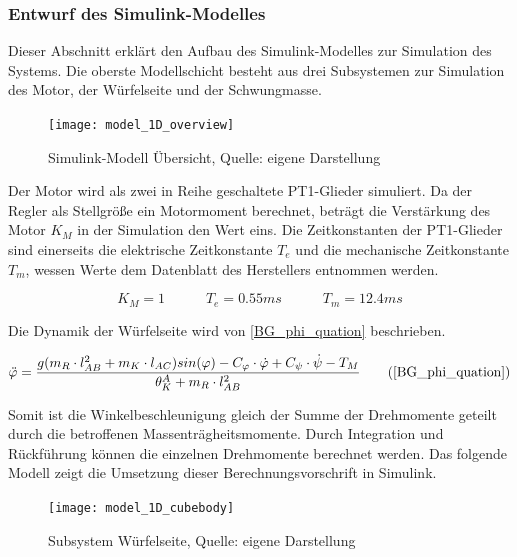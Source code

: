 \newpage
\subsubsection{Entwurf des Simulink-Modelles}
Dieser Abschnitt erklärt den Aufbau des Simulink-Modelles zur Simulation des Systems. Die oberste Modellschicht besteht aus drei Subsystemen zur Simulation des Motor, der Würfelseite und der Schwungmasse.

\begin{figure}[h]
\label{Simulink_1DModell_Overview}
\texttt{[image: model\_1D\_overview]}
\caption{Simulink-Modell Übersicht, Quelle: eigene Darstellung}
\end{figure}

Der Motor wird als zwei in Reihe geschaltete PT1-Glieder simuliert. Da der Regler als Stellgröße ein Motormoment berechnet, beträgt die Verstärkung des Motor $K_M$ in der Simulation den Wert eins. Die Zeitkonstanten der PT1-Glieder sind einerseits die elektrische Zeitkonstante $T_e$ und die mechanische Zeitkonstante $T_m$, wessen Werte dem Datenblatt des Herstellers entnommen werden.

\begin{equation}
K_M = 1 \hspace{35pt} T_e = 0.55ms \hspace{35pt} T_m = 12.4ms
\end{equation}

Die Dynamik der Würfelseite wird von \ref{BG_phi_quation} beschrieben.

\begin{equation}
\ddot{\varphi} = \frac{g(m_R \cdot l_{AB}^2 + m_K \cdot l_{AC})sin(\varphi) - C_{\varphi} \cdot \dot{\varphi} + C_{\psi} \cdot \dot{\psi} - T_M}{{\theta}^A_K + m_R \cdot l_{AB}^2} \tag{\ref{BG_phi_quation}}
\end{equation}

Somit ist die Winkelbeschleunigung gleich der Summe der Drehmomente geteilt durch die betroffenen Massenträgheitsmomente. Durch Integration und Rückführung können die einzelnen Drehmomente berechnet werden. Das folgende Modell zeigt die Umsetzung dieser Berechnungsvorschrift in Simulink.

\begin{figure}[h]
\label{Simulink_1DModell_CubeBody_pic}
\texttt{[image: model\_1D\_cubebody]}
\caption{Subsystem Würfelseite, Quelle: eigene Darstellung}
\end{figure}

